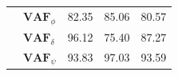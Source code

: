 \begin{table}[]
\begin{tabular}{llcccccc}
                                                   & $\mathbf{VAF}_\phi$                                    & \multicolumn{2}{c}{82.35}                                                                          & \multicolumn{2}{c}{85.06}                                                                          & \multicolumn{2}{c}{80.57}                                                                          \\
                                                   & $\mathbf{VAF}_\delta$                                  & \multicolumn{2}{c}{96.12}                                                                          & \multicolumn{2}{c}{75.40}                                                                          & \multicolumn{2}{c}{87.27}                                                                          \\
                                                   & $\mathbf{VAF}_\psi$                                    & \multicolumn{2}{c}{93.83}                                                                          & \multicolumn{2}{c}{97.03}                                                                          & \multicolumn{2}{c}{93.59}                                                                         
    \end{tabular}
    \end{table}

